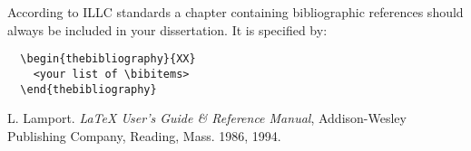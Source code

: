 
\begin{thebibliography}{XX}
According to ILLC standards a chapter containing bibliographic
references should always be included in your dissertation.
It is specified by:
\begin{verbatim}
  \begin{thebibliography}{XX}
    <your list of \bibitems>
  \end{thebibliography}
\end{verbatim}
L. Lamport. {\em \LaTeX{} User's Guide \& Reference
Manual\/}, Addison-Wesley Publishing Company, Reading, Mass. 1986, 1994.
\end{thebibliography}
